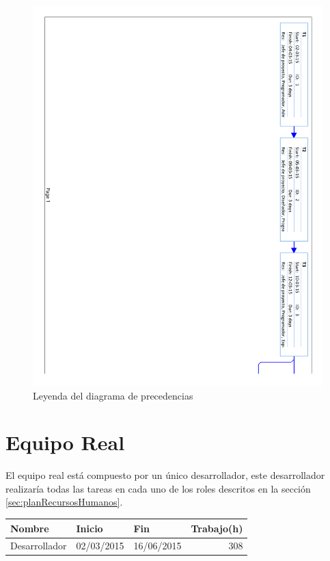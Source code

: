 \begin{figure}[!htbp]
	\centering
	\includegraphics[page=4, scale=.65]{fig/network_diagram}
	\caption{Leyenda del diagrama de precedencias}
\end{figure}


\section{Equipo Real}

El equipo real está compuesto por un único desarrollador, este desarrollador realizaría todas las tareas en cada uno de los roles descritos en la sección \ref{sec:planRecursosHumanos}.

\begin{center}
	\begin{tabular}{|l|l|l|r|}
		\hline
		Nombre & Inicio & Fin & Trabajo(h) \\ \hline
		Desarrollador & 02/03/2015 & 16/06/2015 & 308 \\
		\hline
	\end{tabular}
\end{center}

